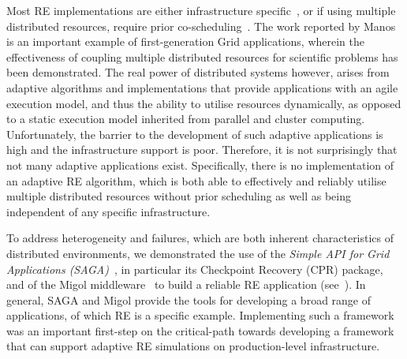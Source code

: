 \documentclass{rspublic}
\newcommand{\jhanote}[1]{ {\textcolor{red} { ***SJ: #1 }}}
\newcommand{\jhanote}[1]{}
\begin{document}
Most RE implementations are either infrastructure
specific~\citep{Woods:2005nx}, or if using multiple distributed
resources, require prior co-scheduling~\citep{repex_mpig}. 
The work reported by Manos is an important example of
first-generation Grid applications, wherein the effectiveness of
coupling multiple distributed resources for scientific problems has
been demonstrated.  %
The real power of distributed systems
however, arises from adaptive algorithms and implementations that
provide applications with an agile execution model, and thus the
ability to utilise resources dynamically, as opposed to a static
execution model inherited from parallel and cluster computing.
Unfortunately, the barrier to the development of such adaptive
applications is high and the infrastructure  support 
is poor.  Therefore, it is not surprisingly that not many adaptive
applications exist. Specifically, there is no implementation of an
adaptive RE algorithm, which is both able to effectively and reliably
utilise multiple distributed resources without prior scheduling as
well as being independent of any specific %
infrastructure.
                      
To address heterogeneity and failures, which are both inherent
characteristics of distributed environments, we demonstrated the use of
the \textit{Simple API for Grid Applications (SAGA)}~\citep{saga_url}, 
in particular its Checkpoint Recovery (CPR) package, and of
the Migol middleware~\citep{schnorLuckow08} to build a reliable RE
application (see~\citet{Luckow:2008la}).
In general, SAGA and Migol provide the tools for developing a broad
range of applications, of which RE is a specific example.
Implementing such a framework 
was an important first-step on the critical-path
towards developing a framework that can support adaptive RE simulations on
production-level infrastructure.
\end{document}
